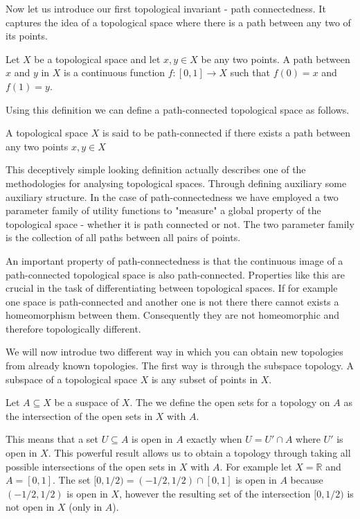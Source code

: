 
Now let us introduce our first topological invariant - path connectedness. It captures the idea of a topological space where there is a path between any two of its points.

\begin{defn} Let $X$ be a topological space and let $x, y \in X$ be any two points. A path between $x$ and $y$ in $X$ is a continuous function $f: [0, 1] \to X$ such that $f(0) = x$ and $f(1) = y$.  \end{defn}

Using this definition we can define a path-connected topological space as follows.

\begin{defn} A topological space $X$ is said to be path-connected if there exists a path between any two points $x, y \in X$  \end{defn}

This deceptively simple looking definition actually describes one of the methodologies for analysing topological spaces. Through defining auxiliary some auxiliary structure. In the case of path-connectedness we have employed a two parameter family of utility functions to "measure" a global property of the topological space - whether it is path connected or not. The two parameter family is the collection of all paths between all pairs of points.

An important property of path-connectedness is that the continuous image of a path-connected topological space is also path-connected. Properties like this are crucial in the task of differentiating between topological spaces. If for example one space is path-connected and another one is not there there cannot exists a homeomorphism between them. Consequently they are not homeomorphic and therefore topologically different.

We will now introdue two different way in which you can obtain new topologies from already known topologies. The first way is through the subspace topology. A subspace of a topological space $X$ is any subset of points in $X$.

\begin{defn} Let $A \subseteq X$ be a suspace of $X$. The we define the open sets for a topology on $A$ as the intersection of the open sets in $X$ with $A$. \end{defn}

This means that a set $U \subseteq A$ is open in $A$ exactly when $U = U' \cap A$ where $U'$ is open in $X$. This powerful result allows us to obtain a topology through taking all possible intersections of the open sets in $X$ with $A$. For example let $X = \mathbb{R}$ and $A = [0, 1]$. The set $[0, 1/2) = (-1/2, 1/2) \cap [0, 1]$ is open in $A$ because $(-1/2, 1/2)$ is open in $X$, however the resulting set of the intersection
$[0, 1/2)$ is not open in $X$ (only in $A$).

